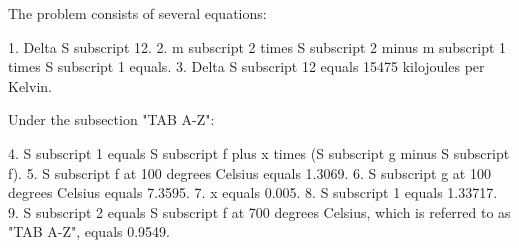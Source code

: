 The problem consists of several equations:

1. Delta S subscript 12.
2. m subscript 2 times S subscript 2 minus m subscript 1 times S subscript 1 equals.
3. Delta S subscript 12 equals 15475 kilojoules per Kelvin.

Under the subsection "TAB A-Z":

4. S subscript 1 equals S subscript f plus x times (S subscript g minus S subscript f).
5. S subscript f at 100 degrees Celsius equals 1.3069.
6. S subscript g at 100 degrees Celsius equals 7.3595.
7. x equals 0.005.
8. S subscript 1 equals 1.33717.
9. S subscript 2 equals S subscript f at 700 degrees Celsius, which is referred to as "TAB A-Z", equals 0.9549.